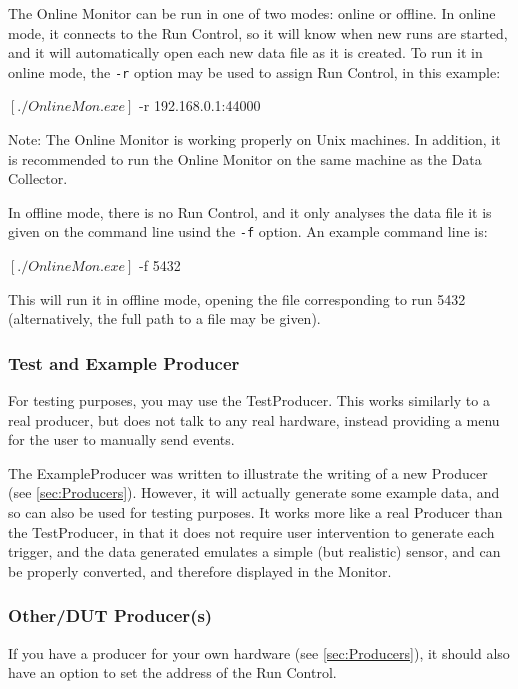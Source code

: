 The Online Monitor can be run in one of two modes: online or offline.
In online mode, it connects to the Run Control, so it will know when new runs are started,
and it will automatically open each new data file as it is created.
To run it in online mode, the \texttt{-r} option may be used to assign Run Control, in this example:
\begin{listing}[mybash]
$[./OnlineMon.exe]$ -r 192.168.0.1:44000
\end{listing}
Note: The Online Monitor is working properly on Unix machines. In addition, it is recommended to run the Online Monitor on the same machine as the Data Collector.

In offline mode, there is no Run Control,
and it only analyses the data file it is given on the command line usind the \texttt{-f} option. 
An example command line is:
\begin{listing}[mybash]
$[./OnlineMon.exe]$ -f 5432
\end{listing}
This will run it in offline mode, opening the file corresponding to run 5432
(alternatively, the full path to a file may be given).

\subsubsection{Test and Example Producer}
\label{sec:testproducer}
For testing purposes, you may use the TestProducer.
This works similarly to a real producer, but does not talk to any real hardware,
instead providing a menu for the user to manually send events.

The ExampleProducer was written to illustrate the writing of a new Producer (see \autoref{sec:Producers}).
However, it will actually generate some example data, and so can also be used for testing purposes.
It works more like a real Producer than the TestProducer,
in that it does not require user intervention to generate each trigger,
and the data generated emulates a simple (but realistic) sensor,
and can be properly converted, and therefore displayed in the Monitor.

\subsubsection{Other/DUT Producer(s)}
If you have a producer for your own hardware (see \autoref{sec:Producers}),
it should also have an option to set the address of the Run Control.

